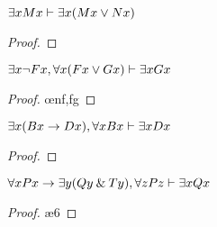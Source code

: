\begin{earg}
\noindent\begin{minipage}{0.99\textwidth}
\item $\exists xMx \vdash \exists x(Mx \vee Nx)$

\begin{proof}
	 \pr{}
	\open
		 \as{}
		 
		 
	\close
	 
\end{proof}
\bigskip
\end{minipage}

\noindent\begin{minipage}{0.99\textwidth}
\item $\exists x {\neg} Fx, \forall x(Fx \vee Gx) \vdash \exists xGx$

\begin{proof}
	 \pr{}
	 \pr{}
	\open
		 \as{}
		 
		 \oe{nf,fg}
		 
	\close
	 
\end{proof}
\bigskip
\end{minipage}



\noindent\begin{minipage}{0.99\textwidth}
\item $\exists x(Bx \rightarrow Dx), \forall xBx \vdash \exists xDx$

\begin{proof}
	 \pr{}
	 \pr{}
	\open
		 \as{}
		 
		 
		 
	\close
	 
\end{proof}
\end{minipage}



\noindent\begin{minipage}{0.99\textwidth}
\item $\forall xPx \rightarrow \exists y(Qy \mathbin{\&} Ty), \forall zPz \vdash \exists xQx$

\begin{proof}
	 \pr{}
	 \pr{}
	 
	 
	 
	\open
		 \as{}
		 \ae{6}
		 
	\close
{} 
\end{proof}
\bigskip
\end{minipage}




\end{earg}
